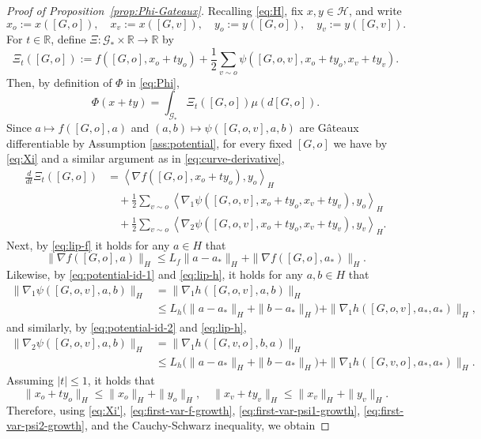 \documentclass[11pt]{article}
\newcommand{\R}{{\mathbb R}}
\newcommand{\be}{\begin{equation}}
\newcommand{\ee}{\end{equation}}
\numberwithin{equation}{section}
\begin{document}
\begin{proof}[Proof of Proposition~\ref{prop:Phi-Gateaux}]
Recalling \eqref{eq:H}, fix \(x,{y}\in\mathcal H\), and write
\[
x_o:=x([G,o]), \quad x_v:=x([G,v]), \quad {y}_o:={y}([G,o]), \quad {y}_v:={y}([G,v]).
\]
For $t\in\R$, define $\Xi:\mathcal{G}_\ast\times\R\to\R$ by
\be\label{eq:Xi}
\Xi_t([G,o])
:=
f([G,o],x_o+t{y}_o)
+
\frac12\sum_{v\sim o}\psi([G,o,v],x_o+t{y}_o,x_v+t{y}_v).
\ee
Then, by definition of $\Phi$ in \eqref{eq:Phi},
\be\label{eq:Phi-Xi}
\Phi(x+t{y})=\int_{\mathcal G_\ast}\Xi_t([G,o])\mu(d[G,o]).
\ee
Since \(a\mapsto f([G,o],a)\) and \((a,b)\mapsto \psi([G,o,v],a,b)\) are G\^ateaux differentiable by Assumption \ref{ass:potential}, for every fixed \([G,o]\) we have by \eqref{eq:Xi} and a similar argument as in \eqref{eq:curve-derivative},
\be\begin{aligned}\label{eq:Xi'}
\frac{d}{dt}\Xi_t([G,o])
&=
\left\langle \nabla f([G,o],x_o+t{y}_o),{y}_o\right\rangle_H \\
&\quad
+
\frac12\sum_{v\sim o}
\left\langle \nabla_1\psi([G,o,v],x_o+t{y}_o,x_v+t{y}_v),{y}_o\right\rangle_H \\
&\quad
+
\frac12\sum_{v\sim o}
\left\langle \nabla_2\psi([G,o,v],x_o+t{y}_o,x_v+t{y}_v),{y}_v\right\rangle_H .
\end{aligned}\ee
Next, by \eqref{eq:lip-f} it holds for any $a\in H$ that
\be\label{eq:first-var-f-growth}
\|\nabla f([G,o],a)\|_H
\le
L_f\|a-a_\ast\|_H+\|\nabla f([G,o],a_\ast)\|_H.
\ee
 Likewise, by \eqref{eq:potential-id-1} and \eqref{eq:lip-h}, it holds for any $a,b\in H$ that
\be\begin{aligned}
\|\nabla_1\psi([G,o,v],a,b)\|_H
&=
\|\nabla_1 h([G,o,v],a,b)\|_H
 \\
&\le
L_h\big(\|a-a_\ast\|_H+\|b-a_\ast\|_H\big)
+
\|\nabla_1 h([G,o,v],a_\ast,a_\ast)\|_H,
\label{eq:first-var-psi1-growth}
\end{aligned}\ee
and similarly, by \eqref{eq:potential-id-2} and \eqref{eq:lip-h},
\be\begin{aligned}
\|\nabla_2\psi([G,o,v],a,b)\|_H
&=
\|\nabla_1 h([G,v,o],b,a)\|_H
 \\
&\le
L_h\big(\|a-a_\ast\|_H+\|b-a_\ast\|_H\big)
+
\|\nabla_1 h([G,v,o],a_\ast,a_\ast)\|_H.
\label{eq:first-var-psi2-growth}
\end{aligned}\ee
Assuming $|t|\leq 1$, it holds that
\[
\|x_o+t{y}_o\|_H \le \|x_o\|_H+\|{y}_o\|_H,
\quad
\|x_v+t{y}_v\|_H \le \|x_v\|_H+\|{y}_v\|_H.
\]
Therefore, using \eqref{eq:Xi'}, \eqref{eq:first-var-f-growth}, \eqref{eq:first-var-psi1-growth}, \eqref{eq:first-var-psi2-growth}, and the Cauchy-Schwarz inequality, we obtain 

\end{proof}
\end{document}
